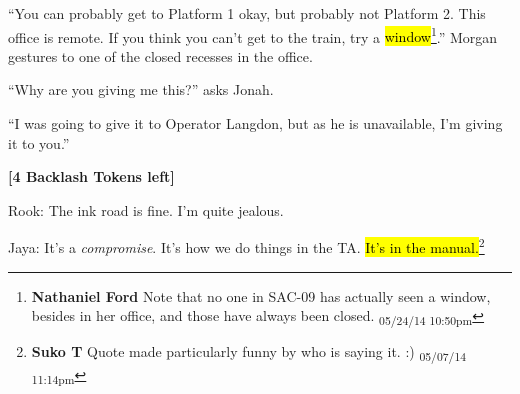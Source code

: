 ``You can probably get to Platform 1 okay, but probably not Platform 2.  This office is remote.  If you think you can't get to the train, try a \hl{window}\footnote{\textbf{Nathaniel Ford }Note that no one in SAC-09 has actually seen a window, besides in her office, and those have always been closed. \textsubscript{05/24/14 10:50pm}}.'' Morgan gestures to one of the closed recesses in the office. 

``Why are you giving me this?'' asks Jonah.

``I was going to give it to Operator Langdon, but as he is unavailable, I'm giving it to you.''





\textbf{{[}4 Backlash Tokens left{]}}





\newpage
{}




Rook: The ink road is fine.  I'm quite jealous.




Jaya: It's a \textit{compromise}.  It's how we do things in the TA.  \hl{It's in the manual.}\footnote{\textbf{Suko T }Quote made particularly funny by who is saying it. :) \textsubscript{05/07/14 11:14pm}}






